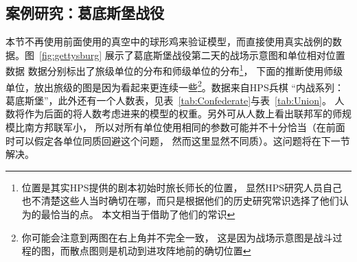 \documentclass{sicnuthesis}
\begin{document}
\subsection{案例研究：葛底斯堡战役}


本节不再使用前面使用的真空中的球形鸡来验证模型，而直接使用真实战例的数据。图~\ref{fig:gettysburg}
展示了葛底斯堡战役第二天的战场示意图和单位相对位置数据
数据分别标出了旅级单位的分布和师级单位的分布\footnote{位置是其实HPS提供的剧本初始时旅长师长的位置，
显然HPS研究人员自己也不清楚这些人当时确切在哪，而只是根据他们的历史研究常识选择了他们认为的最恰当的点。
本文相当于借助了他们的常识}，
下面的推断使用师级单位，放出旅级的图是因为看起来更连续一些\footnote{你可能会注意到两图在右上角并不完全一致，
这是因为战场示意图是战斗过程的图，而散点图则是机动到进攻阵地前的确切位置}。数据来自HPS兵棋
“内战系列：葛底斯堡”，此外还有一个人数表，见表~\ref{tab:Confederate}与表~\ref{tab:Union}。
人数将作为后面的将人数考虑进来的模型的权重。另外可从人数上看出联邦军的师规模比南方邦联军小，
所以对所有单位使用相同的参数可能并不十分恰当（在前面时可以假定各单位同质回避这个问题，
然而这里显然不同质）。这问题将在下一节解决。
\end{document}
